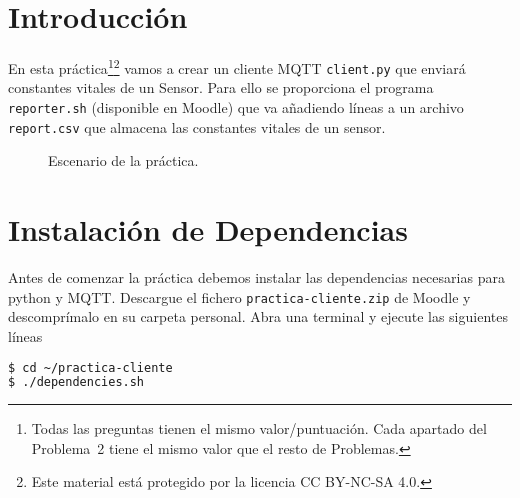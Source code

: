 \documentclass{upmassignment}
\date{\today}
\begin{document}
\section*{Introducción}

\noindent
En esta práctica\footnote{Todas las preguntas
tienen el mismo valor/puntuación.
Cada apartado del Problema~2 tiene el
mismo valor que el resto de Problemas.}\footnote{Este material está protegido por la
licencia
CC BY-NC-SA 4.0.
\byncsa
}
vamos a crear un cliente
MQTT
\texttt{client.py}
que enviará constantes vitales
de un Sensor.
Para ello se proporciona el programa
\texttt{reporter.sh}
(disponible en Moodle)
que va añadiendo líneas a un archivo
\texttt{report.csv}
que almacena las constantes vitales
de un sensor.






\begin{figure}[h]
    \centering
{}
\caption{Escenario de la práctica.}
\label{fig:escenario}
\end{figure}


\section*{Instalación de Dependencias}
\noindent
Antes de comenzar la práctica debemos
instalar las dependencias necesarias
para python y MQTT. 
Descargue el fichero
\texttt{practica-cliente.zip}
de Moodle y descomprímalo en
su carpeta personal.
Abra una terminal y ejecute
las siguientes líneas
\begin{lstlisting}[language=bash]
$ cd ~/practica-cliente
$ ./dependencies.sh
\end{lstlisting}
\end{document}
